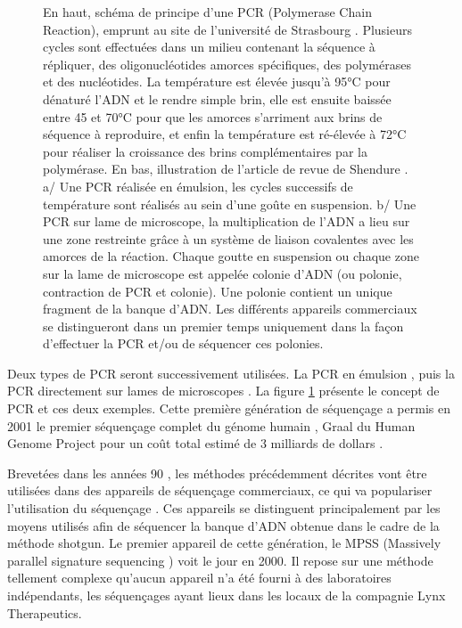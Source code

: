\begin{figure}[H]
\begin{center}
\caption[PCR]{En haut, schéma de principe d'une PCR (Polymerase Chain Reaction), emprunt au site de l'université de Strasbourg \cite{pcrjpg}. Plusieurs cycles sont effectuées dans un milieu contenant la séquence à répliquer, des oligonucléotides amorces spécifiques, des polymérases et des nucléotides. La température est élevée jusqu'à 95°C pour dénaturé l'ADN et le rendre simple brin, elle est ensuite baissée entre 45 et 70°C pour que les amorces s'arriment aux brins de séquence à reproduire, et enfin la température est ré-élevée à 72°C pour réaliser la croissance des brins complémentaires par la polymérase. En bas, illustration de l'article de revue de Shendure \cite{Shendure2008}. a/ Une PCR réalisée en émulsion, les cycles successifs de température sont réalisés au sein d'une goûte en suspension. b/ Une PCR sur lame de microscope, la multiplication de l'ADN a lieu sur une zone restreinte grâce à un système de liaison covalentes avec les amorces de la réaction. Chaque goutte en suspension ou chaque zone sur la lame de microscope est appelée colonie d'ADN (ou polonie, contraction de PCR et colonie). Une polonie contient un unique fragment de la banque d'ADN. Les différents appareils commerciaux se distingueront dans un premier temps uniquement dans la façon d'effectuer la PCR et/ou de séquencer ces polonies.}
\label{pcr}
\end{center}
\end{figure}

Deux types de PCR seront successivement utilisées. La PCR en émulsion \cite{Williams2006}, puis la PCR directement sur lames de microscopes \cite{Shendure2005}. La figure \ref{pcr} présente le concept de PCR et ces deux exemples. Cette première génération de séquençage a permis en 2001 le premier séquençage complet du génome humain \cite{Lander2001,Venter2001}, Graal du Human Genome Project pour un coût total estimé de 3 milliards de dollars \cite{adncost}.


Brevetées dans les années 90 \cite{tsien1991dna,farinelli1998method}, les méthodes précédemment décrites vont être utilisées dans des appareils de séquençage commerciaux, ce qui va populariser l'utilisation du séquençage \cite{Schuster2007}. Ces appareils se distinguent principalement par les moyens utilisés afin de séquencer la banque d'ADN obtenue dans le cadre de la méthode shotgun. Le premier appareil de cette génération, le MPSS (Massively parallel signature sequencing \cite{Brenner2000}) voit le jour en 2000. Il repose sur une méthode tellement complexe qu'aucun appareil n'a été fourni à des laboratoires indépendants, les séquençages ayant lieux dans les locaux de la compagnie Lynx Therapeutics.

